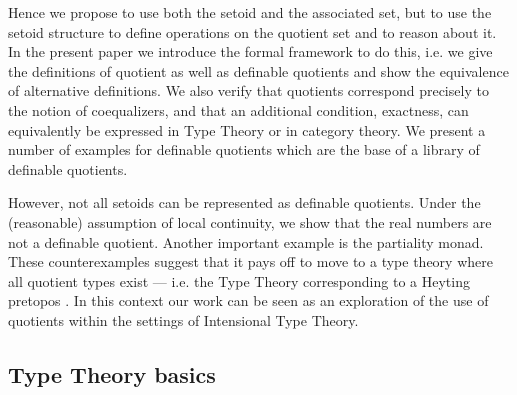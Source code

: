 \documentclass[envcountsame]{llncs}
\begin{document}
Hence we propose to use both the setoid
and the associated set, but to use the setoid structure to define
operations on the quotient set and to reason about it. In the present
paper we introduce the formal framework to do this, i.e. we give the definitions of  quotient as well as definable quotients and show the
equivalence of alternative definitions. We also verify that quotients
correspond precisely to the notion of coequalizers, and that an
additional condition, exactness, can equivalently be expressed in Type
Theory or in category theory. We present a number of examples for
definable quotients which are the base of a library of definable
quotients.

However, not all setoids can be represented as definable
quotients. Under the (reasonable) assumption of local continuity, we
show that the real numbers are not a definable quotient. Another
important example is the partiality monad. These counterexamples
suggest that it pays off to move to a type theory where all quotient
types exist --- i.e. the Type Theory corresponding to a Heyting
pretopos \cite{maietti1999effective}. In this context our work can be
seen as an exploration of the use of quotients within the settings of
Intensional Type Theory.

\subsection{Type Theory basics}
\label{sec:type-theory-basics}
\end{document}
